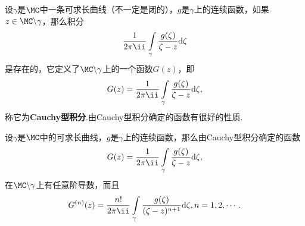 设$\gamma$是$\MC$中一条可求长曲线（不一定是闭的），$g$是$\gamma$上的连续函数，如果$z\in\MC\backslash\gamma$，那么积分
\[\frac1{2\pi\ii}\int\limits_\gamma\frac{g(\zeta)}{\zeta-z}\textrm d\zeta\]
是存在的，它定义了$\MC\backslash\gamma$上的一个函数$G(z)$，即
\[G(z)=\frac1{2\pi\ii}\int\limits_\gamma\frac{g(\zeta)}{\zeta-z}\textrm d\zeta,\]
称它为\textbf{Cauchy型积分}.由Cauchy型积分确定的函数有很好的性质.
\begin{theorem}\label{thm3.4.2}
设$\gamma$是$\MC$中的可求长曲线，$g$是$\gamma$上的连续函数，那么由Cauchy型积分确定的函数
\[G(z)=\frac1{2\pi\ii}\int\limits_\gamma\frac{g(\zeta)}{\zeta-z}\textrm d\zeta,\]
在$\MC\backslash\gamma$上有任意阶导数，而且
\begin{equation}\label{eq3.4.4}
  G^{(n)}(z)=\frac{n!}{2\pi\ii}\int\limits_\gamma\frac{g(\zeta)}{(\zeta-z)^{n+1}}\textrm d\zeta,n=1,2,\cdots.
\end{equation}
\end{theorem}
